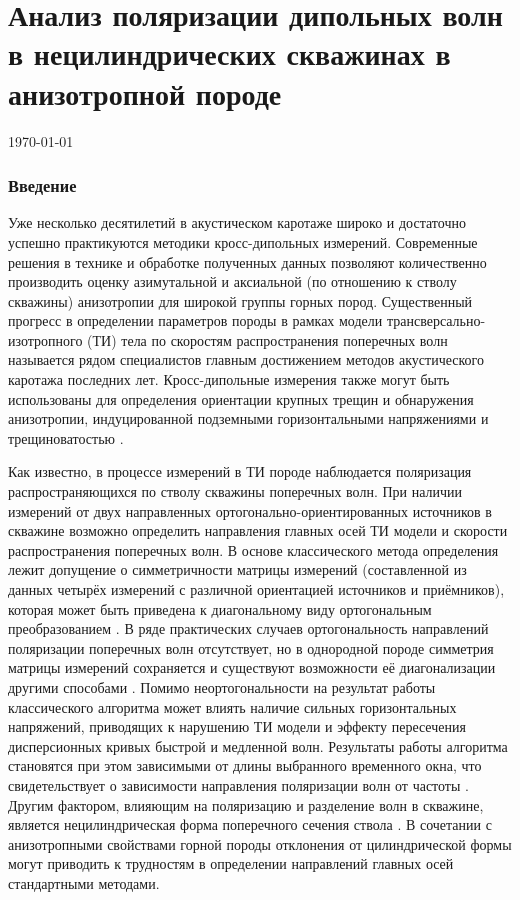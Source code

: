 \documentclass[a4paper,11pt]{article}
\begin{document}
\part*{Анализ поляризации дипольных волн в нецилиндрических скважинах в анизотропной породе}
\today

\section{Введение}
Уже несколько десятилетий в акустическом каротаже широко и достаточно успешно практикуются методики кросс-дипольных измерений. Современные решения в технике и обработке полученных данных позволяют количественно производить оценку азимутальной и аксиальной (по отношению к стволу скважины) анизотропии для широкой группы горных пород. Существенный прогресс в определении параметров породы в рамках модели трансверсально-изотропного (ТИ) тела по скоростям распространения поперечных волн называется рядом специалистов главным достижением методов акустического каротажа последних лет. Кросс-дипольные измерения также могут быть использованы для определения ориентации крупных трещин и обнаружения анизотропии, индуцированной подземными горизонтальными напряжениями и трещиноватостью \cite{Patterson2001}.

Как известно, в процессе измерений в ТИ породе наблюдается поляризация распространяющихся по стволу скважины поперечных волн. При наличии измерений от двух направленных ортогонально-ориентированных источников в скважине возможно определить направления главных осей ТИ модели и скорости распространения поперечных волн. В основе классического метода определения лежит допущение о симметричности матрицы измерений (составленной из данных четырёх измерений с различной ориентацией источников и приёмников), которая может быть приведена к диагональному виду ортогональным преобразованием \cite{Alford1986}. В ряде практических случаев ортогональность направлений поляризации поперечных волн отсутствует, но в однородной породе симметрия матрицы измерений сохраняется и существуют возможности её диагонализации другими способами \cite{Dellinger1998}. Помимо неортогональности на результат работы классического алгоритма может влиять наличие сильных горизонтальных напряжений, приводящих к нарушению ТИ модели и эффекту пересечения дисперсионных кривых быстрой и медленной волн. Результаты работы алгоритма становятся при этом зависимыми от длины выбранного временного окна, что свидетельствует о зависимости направления поляризации волн от частоты \cite{Nolte1997}. Другим фактором, влияющим на поляризацию и разделение волн в скважине, является нецилиндрическая форма поперечного сечения ствола \cite{Seroices2010}. В сочетании с анизотропными свойствами горной породы отклонения от цилиндрической формы могут приводить к трудностям в определении направлений главных осей стандартными методами.
\end{document}
